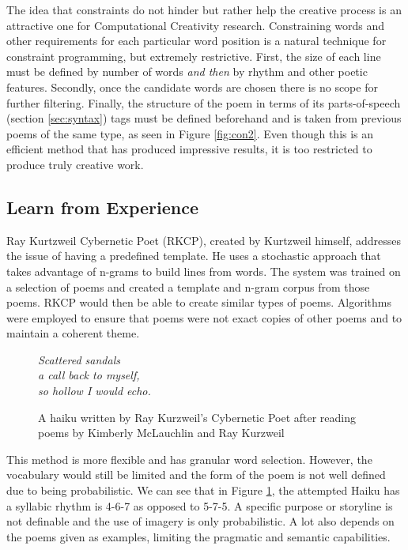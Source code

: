 The idea that constraints do not hinder but rather help the creative process is an attractive one for Computational Creativity research. Constraining words and other requirements for each particular word position is a natural technique for constraint programming, but extremely restrictive. First, the size of each line must be defined by number of words \textit{and then} by rhythm and other poetic features. Secondly, once the candidate words are chosen there is no scope for further filtering. Finally, the structure of the poem in terms of its parts-of-speech (section \ref{sec:syntax}) tags must be defined beforehand and is taken from previous poems of the same type, as seen in Figure \ref{fig:con2}. Even though this is an efficient method that has produced impressive results, it is too restricted to produce truly creative work.

\subsection{Learn from Experience}

Ray Kurtzweil Cybernetic Poet (RKCP), created by Kurtzweil himself\cite{kurzweil1999ray}, addresses the issue of having a predefined template. He uses a stochastic approach that takes advantage of n-grams to build lines from words. The system was trained on a selection of poems and created a template and n-gram corpus from those poems. RKCP would then be able to create similar types of poems. Algorithms were employed to ensure that poems were not exact copies of other poems and to maintain a coherent theme.

\begin{figure}[h!]
\centering
\textit{
Scattered sandals\\
a call back to myself,\\
so hollow I would echo.
}
\caption{A haiku written by Ray Kurzweil's Cybernetic Poet after reading poems by Kimberly McLauchlin and Ray Kurzweil}
\label{fig:rkcp}
\end{figure}

This method is more flexible and has granular word selection. However, the vocabulary would still be limited and the form of the poem is not well defined due to being probabilistic. We can see that in Figure \ref{fig:rkcp}, the attempted Haiku has a syllabic rhythm is 4-6-7 as opposed to 5-7-5. A specific purpose or storyline is not definable and the use of imagery is only probabilistic. A lot also depends on the poems given as examples, limiting the pragmatic and semantic capabilities.


